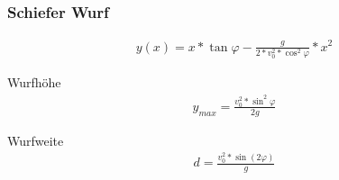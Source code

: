 \documentclass[17pt]{extarticle}
\begin{document}
	\subsubsection{Schiefer Wurf}
	\begin{align}
		y(x) = x * \tan \varphi - \frac{g}{2 * v_{0}^{2} * \cos^{2} \varphi} * x^{2}
	\end{align}
	
	Wurfhöhe
	\begin{align}
		y_{max} = \frac{v_{0}^{2} * \sin^{2} \varphi}{2g}
	\end{align}
	
	Wurfweite
	\begin{align}
		d = \frac{v_{0}^{2} * \sin(2\varphi)}{g}
	\end{align}
\end{document}
